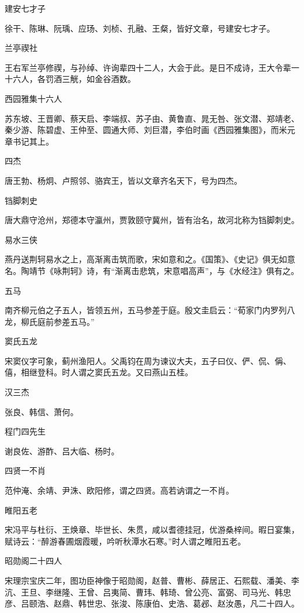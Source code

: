 \documentclass[a4paper,12pt,UTF8,twoside]{ctexbook}
\begin{document}
    建安七才子
    
    徐干、陈琳、阮瑀、应玚、刘桢、孔融、王粲，皆好文章，号建安七才子。
    
    兰亭禊社
    
    王右军兰亭修禊，与孙绰、许询辈四十二人，大会于此。是日不成诗，王大令辈一十六人，各罚酒三觥，如金谷酒数。
    
    西园雅集十六人
    
    苏东坡、王晋卿、蔡天启、李端叔、苏子由、黄鲁直、晁无咎、张文潜、郑靖老、秦少游、陈碧虚、王仲至、圆通大师、刘巨潜，李伯时画《西园雅集图》，而米元章书记其上。
    
    四杰
    
    唐王勃、杨炯、卢照邻、骆宾王，皆以文章齐名天下，号为四杰。
    
    铛脚刺史
    
    唐大鼎守沧州，郑德本守瀛州，贾敦颐守冀州，皆有治名，故河北称为铛脚刺史。
    
    易水三侠
    
    燕丹送荆轲易水之上，高渐离击筑而歌，宋如意和之。《国策》、《史记》俱无如意名。陶靖节《咏荆轲》诗，有“渐离击悲筑，宋意唱高声”，与《水经注》俱有之。
    
    五马
    
    南齐柳元伯之子五人，皆领五州，五马参差于庭。殷文圭启云：“荀家门内罗列八龙，柳氏庭前参差五马。”
    
    窦氏五龙
    
    宋窦仪字可象，蓟州渔阳人。父禹钧在周为谏议大夫，五子曰仪、俨、侃、偁、僖，相继登科。时人谓之窦氏五龙。又曰燕山五桂。
    
    汉三杰
    
    张良、韩信、萧何。
    
    程门四先生
    
    谢良佐、游酢、吕大临、杨时。
    
    四贤一不肖
    
    范仲淹、余靖、尹洙、欧阳修，谓之四贤。高若讷谓之一不肖。
    
    睢阳五老
    
    宋冯平与杜衍、王焕章、毕世长、朱贯，咸以耆德挂冠，优游桑梓间。暇日宴集，赋诗云：“醉游春圃烟霞暖，吟听秋潭水石寒。”时人谓之睢阳五老。
    
    昭勋阁二十四人
    
    宋理宗宝庆二年，图功臣神像于昭勋阁，赵普、曹彬、薛居正、石熙载、潘美、李沆、王旦、李继隆、王曾、吕夷简、曹玮、韩琦、曾公亮、富弼、司马光、韩忠彦、吕颐浩、赵鼎、韩世忠、张浚、陈康伯、史浩、葛邲、赵汝愚，凡二十四人。
    
\end{document}
